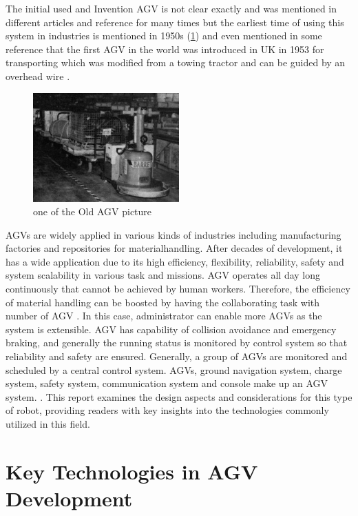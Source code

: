 \documentclass[main]{subfiles}
\begin{document}
The initial used and Invention AGV is not clear exactly and
was mentioned in different articles and
reference for many times but the earliest
time of using this system in industries is
mentioned in 1950s \cite{reveliotis2000conflict}
(\cref{oldAgv}) and even
mentioned in some reference that the first
AGV in the world was introduced in UK in
1953 for transporting which was modified
from a towing tractor and can be guided by
an overhead wire \cite{moshayedi2019agv}.

\begin{figure}[H]
    \centering
\includegraphics[width=0.5\textwidth]{doc/oldestAGV.jpg}
\caption{one of the Old AGV picture}
\label{oldAgv} %
\end{figure}

AGVs are widely applied in various kinds
of industries including manufacturing
factories and repositories for materialhandling.
After decades of development, it
has a wide application due to its high
efficiency, flexibility, reliability, safety and
system scalability in various task and
missions.
AGV operates all day long continuously
that cannot be achieved by human workers.
Therefore, the efficiency of material
handling can be boosted by having the
collaborating task with number of AGV
. In this case, administrator can enable
more AGVs as the system is extensible.
AGV has capability of collision avoidance
and emergency braking, and generally the
running status is monitored by control
system so that reliability and safety are
ensured. Generally, a group of AGVs are
monitored and scheduled by a central
control system. AGVs, ground navigation
system, charge system, safety system,
communication system and console make
up an AGV system. \cite{shengfang2006research}. This report examines the design aspects and considerations for this type of robot, providing readers with key insights into the technologies commonly utilized in this field. 

\section{Key Technologies in AGV Development}
\end{document}
